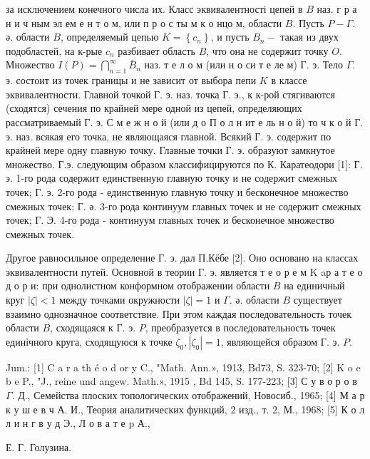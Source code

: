 \documentclass[10pt]{article}
\begin{document}
за исключением конечного числа их. Класс эквивалентності цепей в $B$ наз. г р а н и ч ным эл ем е н т о м, или п р о с ты м к о нцо м, области $B$. Пусть $P-\Gamma$. ә. области $B$, определяемый цепью $K=\left\{c_{n}\right\}$, и пусть $B_{n}-$ такая из двух подобластей, на к-рые $c_{n}$ разбивает область $B$, что она не содержит точку $O$. Множество $I(P)=\bigcap_{n=1}^{\infty} \bar{B}_{n}$ наз. т е л о м (или н о си т е ле м) $Г$. э. Тело $\Gamma$. э. состоит из точек границы и не зависит от выбора пепи $K$ в классе эквивалентности. Главной точкой Г. э. наз. точка Г. э., к к-рой стягиваются (сходятся) сечения по крайней мере одной из цепей, определяющих рассматриваемый Г. э. С м е ж н о й (или д о П о л н ит е ль н о й) то ч к о й Г. э. наз. всякая его точка, не являющаяся главной. Всякий Г. э. содержит по крайней мере одну главную точку. Главные точки Г. э. образуют замкнутое множество. Г.э. следующим образом классифицируются по К. Каратеодори [1]: Г. э. 1-го рода содержит единственную главную точку и не содержит смежных точек; Г. э. 2-го рода - единственную главную точку и бесконечное множество смежных точек; Г. ә. 3-го рода континуум главных точек и не содержит смежных точек; Г. Э. 4-го рода - континуум главных точек и бесконечное множество смежных точек.



Другое равносильное определение Г. э. дал П.Кёбе [2]. Оно основано на классах эквивалентности путей. Основной в теории Г. э. является т е о р е м $\mathrm{K}$ aр а т е о д о р и: при однолистном конформном отображении области $B$ на единичный круг $|\zeta|<1$ между точками окружности $|\zeta|=1$ и $\Gamma$. ә. области $B$ существует взаимно однозначное соответствие. При этом каждая последовательность точек области $B$, сходящаяся к $Г$. э. $P$, преобразуется в последовательность точек единічного круга, сходящуюся к точке $\zeta_{0},\left|\zeta_{0}\right|=1$, являющейся образом Г. э. $P$.



Jum.: [1] C a r a th é o d or y C., "Math. Ann.», 1913, $\mathrm{Bd} 73$, S. 323-70; [2] K o e b e P., "J., reine und angew. Math.», 1915 , Bd 145, S. 177-223; [3] С у в о р о в $\Gamma$. Д., Семейства плоских топологических отображений, Новосиб., 1965; [4] М а р к у ш е в ч А. И., Теория аналитических функций, 2 изд., т. 2, М., 1968; [5] К о л л и н г в у д Э., Л о в а т е p А.,



Е. Г. Голузина.
\end{document}
